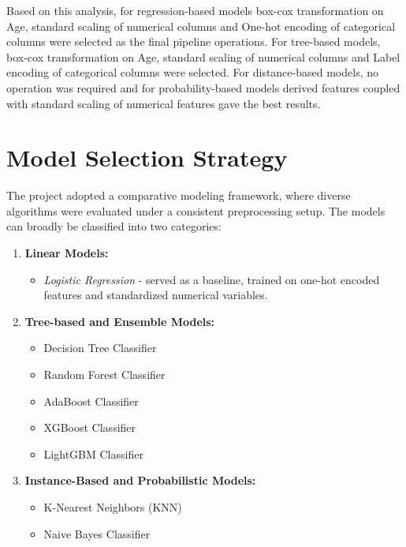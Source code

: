 
Based on this analysis, for regression-based models box-cox transformation on Age, standard scaling of numerical columns and One-hot encoding of categorical columns were selected as the final pipeline operations. For tree-based models, box-cox transformation on Age, standard scaling of numerical columns and Label encoding of categorical columns were selected. For distance-based models, no operation was required and for probability-based models derived features coupled with standard scaling of numerical features gave the best results.

\section{Model Selection Strategy}\label{sec:model-selection-strategy}
The project adopted a comparative modeling framework, where diverse algorithms were evaluated under a consistent preprocessing setup.
The models can broadly be classified into two categories:

\begin{enumerate}
    \item \textbf{Linear Models:}
    \begin{itemize}
        \item \textit{Logistic Regression} - served as a baseline, trained on one-hot encoded features and standardized numerical variables.
    \end{itemize}

    \item \textbf{Tree-based and Ensemble Models:}
    \begin{itemize}
        \item Decision Tree Classifier
        \item Random Forest Classifier
        \item AdaBoost Classifier
        \item XGBoost Classifier
        \item LightGBM Classifier
    \end{itemize}

    \item \textbf{Instance-Based and Probabilistic Models:}
    \begin{itemize}
        \item K-Nearest Neighbors (KNN)
        \item Naive Bayes Classifier
    \end{itemize}
\end{enumerate}

